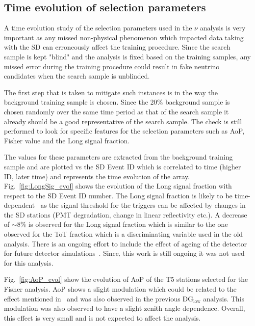 \subsection{Time evolution of selection parameters}
\label{subsec:nu_sel_timeev}

A time evolution study of the selection parameters used in the $\nu$ analysis is very important as any missed non-physical phenomenon which impacted data taking with the SD can erroneously affect the training procedure. Since the search sample is kept "blind" and the analysis is fixed based on the training samples, any missed error during the training procedure could result in fake neutrino candidates when the search sample is unblinded. 

The first step that is taken to mitigate such instances is in the way the background training sample is chosen. Since the 20\% background sample is chosen randomly over the same time period as that of the search sample it already should be a good representative of the search sample. The check is still performed to look for specific features for the selection parameters such as AoP, Fisher value and the Long signal fraction. 

The values for these parameters are extracted from the background training sample and are plotted vs the SD Event ID which is correlated to time (higher ID, later time) and represents the time evolution of the array. Fig.~\ref{fig:LongSig_evol} shows the evolution of the Long signal fraction with respect to the SD Event ID number. The Long signal fraction is likely to be time-dependent~\cite{Sato:2011zze} as the signal threshold for the triggers can be affected by changes in the SD stations (PMT degradation, change in linear reflectivity etc.). A decrease of $\sim 8\%$ is observed for the Long signal fraction which is similar to the one observed for the ToT fraction which is a discriminating variable used in the old analysis. There is an ongoing effort to include the effect of ageing of the detector for future detector simulations~\cite{PierreAuger:2023xfj}. Since, this work is still ongoing it was not used for this analysis. 

Fig.~\ref{fig:AoP_evol} show the evolution of AoP of the T5 stations selected for the Fisher analysis. AoP shows a slight modulation which could be related to the effect mentioned in~\cite{Sato:2011zze} and was also observed in the previous DG$\mathrm{_{low}}$ analysis. This modulation was also observed to have a slight zenith angle dependence. Overall, this effect is very small and is not expected to affect the analysis.

